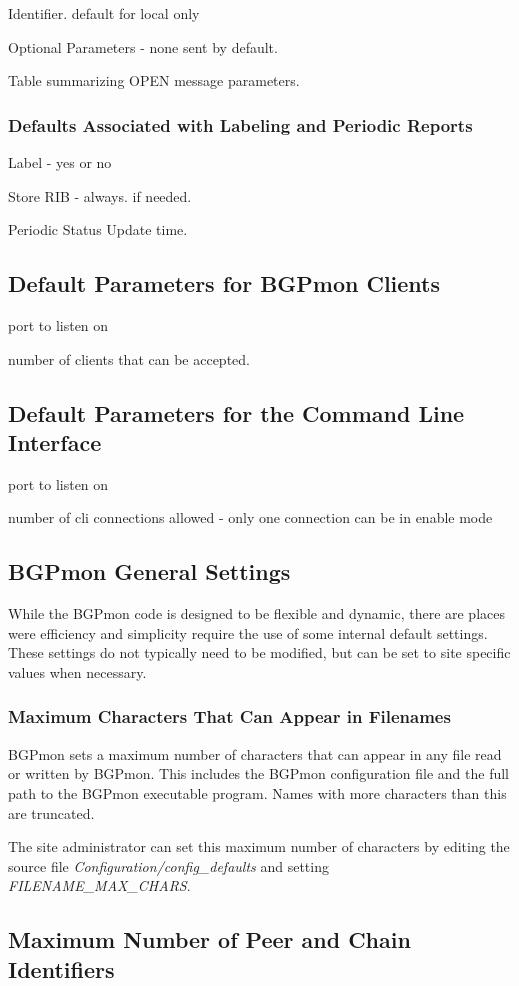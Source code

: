 Identifier.   default for local only 

Optional Parameters - none sent by default.

Table summarizing OPEN message parameters.


\subsubsection{Defaults Associated with Labeling and Periodic Reports}

Label - yes or no

Store RIB -  always.    if needed.

Periodic Status Update time.

\subsection{Default Parameters for BGPmon Clients}
\label{sec:custom:clients}

port to listen on

number of clients that can be accepted.

\subsection{Default Parameters for the Command Line Interface}
\label{sec:custom:cli}

port to listen on

number of cli connections allowed - only one connection can be in enable mode

\subsection{BGPmon General Settings}
\label{sec:custom:general}

While the BGPmon code is designed to be flexible and dynamic, there are places were efficiency and simplicity require the use of some internal default settings.    These settings do not typically need to be modified, but can be set to site specific values when necessary.      
  
\subsubsection{Maximum Characters That Can Appear in Filenames}    

BGPmon sets a maximum number of characters that can appear in any file read or written by BGPmon.   This includes the BGPmon configuration file and the full path to the BGPmon executable program.  Names  with more characters than this are truncated.

The site administrator can set this maximum number of characters by editing the source file \emph{Configuration/config\_defaults} and setting \emph{FILENAME\_MAX\_CHARS}.     

\subsection{Maximum Number of Peer and Chain Identifiers}

